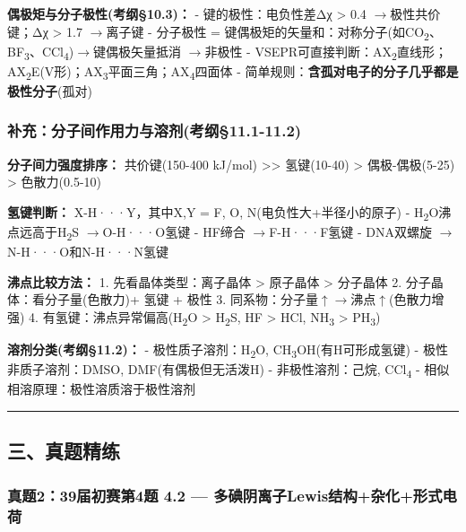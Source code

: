 \documentclass[a4paper,11pt]{ctexart}
\newcommand{\箭}{\ensuremath{\rightarrow}}
\newcommand{\左箭}{\ensuremath{\leftarrow}}
\newcommand{\上箭}{\ensuremath{\uparrow}}
\newcommand{\下箭}{\ensuremath{\downarrow}}
\newcommand{\衡}{\ensuremath{\rightleftharpoons}}
\newcommand{\双箭}{\ensuremath{\leftrightarrow}}
\newcommand{\约等于}{\ensuremath{\approx}}
\newcommand{\小于等于}{\ensuremath{\leq}}
\newcommand{\大于等于}{\ensuremath{\geq}}
\newcommand{\不等于}{\ensuremath{\neq}}
\newcommand{\西格马}{\ensuremath{\sigma}}
\newcommand{\派}{\ensuremath{\pi}}
\begin{document}
\textbf{偶极矩与分子极性(考纲§10.3)：}
- 键的极性：电负性差Δχ \textgreater{} 0.4 \箭 极性共价键；Δχ \textgreater{} 1.7 \箭 离子键
- 分子极性 = 键偶极矩的矢量和：对称分子(如CO\textsubscript{2}、BF\textsubscript{3}、CCl\textsubscript{4})\箭 键偶极矢量抵消 \箭 非极性
- VSEPR可直接判断：AX\textsubscript{2}直线形；AX\textsubscript{2}E(V形)；AX\textsubscript{3}平面三角；AX\textsubscript{4}四面体
- 简单规则：\textbf{含孤对电子的分子几乎都是极性分子}(孤对)

\subsubsection{补充：分子间作用力与溶剂(考纲§11.1-11.2)}\label{ux8865ux5145ux5206ux5b50ux95f4ux4f5cux7528ux529bux4e0eux6eb6ux5242ux8003ux7eb211.1-11.2}

\textbf{分子间力强度排序：}
共价键(150-400 kJ/mol) \textgreater\textgreater{} 氢键(10-40) \textgreater{} 偶极-偶极(5-25) \textgreater{} 色散力(0.5-10)

\textbf{氢键判断：} X-H···Y，其中X,Y = F, O, N(电负性大+半径小的原子)
- H\textsubscript{2}O沸点远高于H\textsubscript{2}S \箭 O-H···O氢键
- HF缔合 \箭 F-H···F氢键
- DNA双螺旋 \箭 N-H···O和N-H···N氢键

\textbf{沸点比较方法：}
1. 先看晶体类型：离子晶体 \textgreater{} 原子晶体 \textgreater{} 分子晶体
2. 分子晶体：看分子量(色散力)+ 氢键 + 极性
3. 同系物：分子量\上箭 \箭 沸点\上箭(色散力增强)
4. 有氢键：沸点异常偏高(H\textsubscript{2}O \textgreater{} H\textsubscript{2}S, HF \textgreater{} HCl, NH\textsubscript{3} \textgreater{} PH\textsubscript{3})

\textbf{溶剂分类(考纲§11.2)：}
- 极性质子溶剂：H\textsubscript{2}O, CH\textsubscript{3}OH(有H可形成氢键)
- 极性非质子溶剂：DMSO, DMF(有偶极但无活泼H)
- 非极性溶剂：己烷, CCl\textsubscript{4}
- 相似相溶原理：极性溶质溶于极性溶剂

\begin{center}\rule{0.5\linewidth}{0.5pt}\end{center}

\subsection{三、真题精练}\label{ux4e09ux771fux9898ux7cbeux7ec3}

\subsubsection{真题2：39届初赛第4题 4.2 --- 多碘阴离子Lewis结构+杂化+形式电荷}\label{ux771fux9898239ux5c4aux521dux8d5bux7b2c4ux9898-4.2-ux591aux7898ux9634ux79bbux5b50lewisux7ed3ux6784ux6742ux5316ux5f62ux5f0fux7535ux8377}
\end{document}
